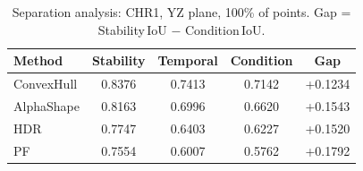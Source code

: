 \begin{table}[ht]
\centering
\small
\caption{Separation analysis: CHR1, YZ plane, 100\% of points. Gap = Stability\,IoU $-$ Condition\,IoU.}
\label{tab:sep_chr1}
\begin{tabular}{lcccc}
\toprule
Method & Stability & Temporal & Condition & Gap \\
\midrule
ConvexHull & 0.8376 & 0.7413 & 0.7142 & +0.1234 \\
AlphaShape & 0.8163 & 0.6996 & 0.6620 & +0.1543 \\
HDR & 0.7747 & 0.6403 & 0.6227 & +0.1520 \\
PF & 0.7554 & 0.6007 & 0.5762 & +0.1792 \\
\bottomrule
\end{tabular}
\end{table}